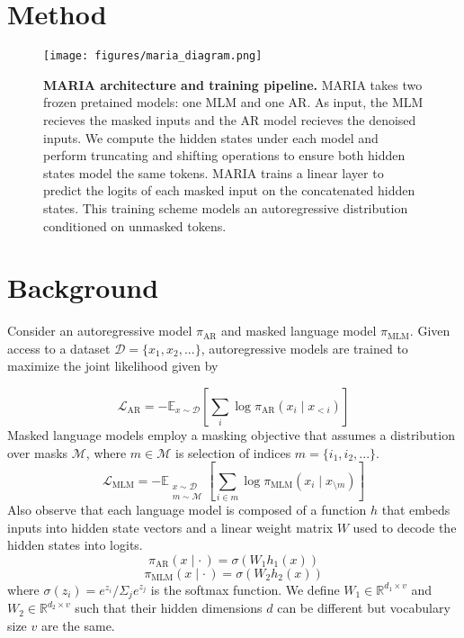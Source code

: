 \section{Method}
\label{sec:method}
\begin{figure*}
    \centering
    \texttt{[image: figures/maria\_diagram.png]}
    \caption{\textbf{MARIA architecture and training pipeline.} MARIA takes two frozen pretained models: one MLM and one AR. As input, the MLM recieves the masked inputs and the AR model recieves the denoised inputs. We compute the hidden states under each model and perform truncating and shifting operations to ensure both hidden states model the same tokens. MARIA trains a linear layer to predict the logits of each masked input on the concatenated hidden states. This training scheme models an autoregressive distribution conditioned on unmasked tokens.}
    \label{fig:maria_diagram}
\end{figure*}
\section*{Background}
Consider an autoregressive model $\pi_{\mathrm{AR}}$ and masked language model $\pi_{\mathrm{MLM}}$. Given access to a dataset $\mathcal{D} = \{x_1, x_2, ...\}$, autoregressive models are trained to maximize the joint likelihood given by


\begin{equation}
    \mathcal{L}_{\mathrm{AR}} = -\mathbb{E}_{x\sim \mathcal{D}} \left[ \sum_{i} \log \pi_{\mathrm{AR}}(x_i \mid x_{<i}) \right]
\end{equation}
Masked language models employ a masking objective  that assumes a distribution over masks $\mathcal{M}$, where $m \in \mathcal{M}$ is selection of indices $m = \{i_1, i_2, ...\}$.
\begin{equation}
    \mathcal{L}_{\mathrm{MLM}} = -\mathbb{E}_{\substack{x \sim \mathcal{D}\\m \sim \mathcal{M}}}\left[ \sum_{i \in m} \log \pi_{\mathrm{MLM}}(x_i \mid x_{\setminus m}) \right]
\end{equation}
Also observe that each language model is composed of a function $h$ that embeds inputs into hidden state vectors and a linear weight matrix $W$ used to decode the hidden states into logits.
\begin{equation}
    \pi_{\mathrm{AR}}(x \mid \cdot\,) = \sigma\left(W_1 h_1(x)\right) 
\end{equation}
\begin{equation}
    \pi_{\mathrm{MLM}}(x \mid \cdot\,) = \sigma\left(W_2 h_2(x)\right)
\end{equation}
where $\sigma(z_i) = e^{z_i}/ \Sigma_j e^{z_j}$ is the softmax function. We define $W_1 \in \mathbb{R}^{d_1 \times v}$ and $W_2 \in \mathbb{R}^{d_2 \times v}$ such that their hidden dimensions $d$ can be different but vocabulary size $v$ are the same.
